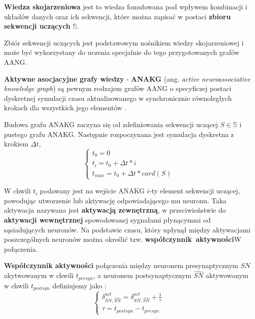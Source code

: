 \begin{definicja}
    \label{def:wiedzaSkoj}
    \textbf{Wiedza skojarzeniowa} jest to wiedza fomułowana pod wpływem kombinacji i układów danych oraz ich sekwencji, które można zapisać w postaci \textbf{zbioru sekwencji uczących}
    $\mathbb{S}$.
\end{definicja}

Zbiór sekwencji uczących jest podstawowym nośnikiem wiedzy skojarzeniowej i może być wykorzystany do uczenia specjalnie do tego przygotowanych grafów AANG.

\begin{definicja}
    \label{def:anakg}
    \textbf{Aktywne asocjacyjne grafy wiedzy} - \textbf{ANAKG} (ang. \emph{active neuroassociative knowledge graph}) są pewnym rodzajem grafów AANG o specyficzej postaci dyskretnej
     symulacji czasu aktualizowanego w synchronicznie równoległych krokach dla wszystkich jego elementów \cite[s. 234]{Horzyk}.
\end{definicja}

Budowa grafu ANAKG zaczyna się od zdefiniowania sekwencji uczącej $S \in \mathbb{S}$ i pustego grafu ANAKG. Następnie rozpoczynana jest symulacja dyskretna z krokiem $\Delta t$, 
\begin{equation}
\label{eq:anakg}
\begin{cases}
    t_0 = 0 \\
    t_i = t_0 + \Delta t * i \\
    t_{max} = t_0 + \Delta t * card(S)
\end{cases}
\end{equation}

W chwili $t_i$ podawany jest na wejście ANAKG $i$-ty element sekwencji uczącej, powodując utworzenie lub aktywację odpowiadającego mu neuronu.
Taka aktywacja nazywana jest \textbf{aktywacją zewnętrzną}, w przeciwieństwie do \textbf{aktywacji wewnętrznej} spowodowanej sygnałami płynącymmi od
sąsiadujących neuronów. Na podstawie czasu, który upłynął między aktywacjami poszczególnych neuronów można określić tzw. \textbf{współczynnik~aktywności}W
połączenia.

\begin{definicja}
    \label{def:wspAkt}
    \textbf{Współczynnik aktywności} połączenia między neuronem presynaptycznym $SN$ akytwowanym w chwili $t_{presyn}$, a neuronem postsynaptycznym 
    $\widehat{SN}$ aktywowanym w chwili $t_{postsyn}$ definiujemy jako \cite[s. 224]{Horzyk}:
    \begin{equation}
        \begin{cases}
            \delta_{SN, \widehat{SN}}^{act} = \delta_{SN, \widehat{SN}}^{act} + \frac {1}{\tau}\\
            \tau = t_{postsyn} - t_{presyn}
        \end{cases}
    \end{equation}
\end{definicja}

